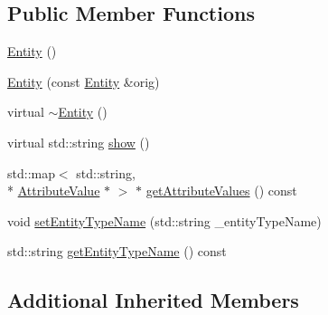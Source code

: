 \subsection*{Public Member Functions}
\begin{DoxyCompactItemize}
\item 
\hyperlink{class_entity_a980f368aa07ce358583982821533a54a}{Entity} ()
\item 
\hyperlink{class_entity_a9de139ff12775dd95fb80bec08247de7}{Entity} (const \hyperlink{class_entity}{Entity} \&orig)
\item 
virtual \hyperlink{class_entity_adf6d3f7cb1b2ba029b6b048a395cc8ae}{$\sim$\-Entity} ()
\item 
virtual std\-::string \hyperlink{class_entity_a86cc324050b451b31b134943e7978e36}{show} ()
\item 
std\-::map$<$ std\-::string, \\*
\hyperlink{class_attribute_value}{Attribute\-Value} $\ast$ $>$ $\ast$ \hyperlink{class_entity_a5990dbefc2f21a7e8e0f91f9bf434fb9}{get\-Attribute\-Values} () const 
\item 
void \hyperlink{class_entity_a40053760a2c84dd72fd5aeb425f6781d}{set\-Entity\-Type\-Name} (std\-::string \-\_\-entity\-Type\-Name)
\item 
std\-::string \hyperlink{class_entity_a860a6385aa2af6b8d205a8e3ea912c38}{get\-Entity\-Type\-Name} () const 
\end{DoxyCompactItemize}
\subsection*{Additional Inherited Members}


